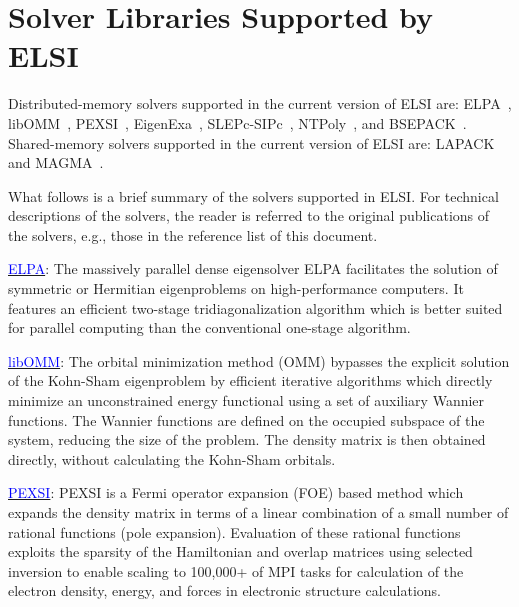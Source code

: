 \documentclass{report}
\newcommand{\tcb}[1]{\textcolor{blue}{#1}}
\begin{document}
\section{Solver Libraries Supported by ELSI}
\label{sec:solvers}
Distributed-memory solvers supported in the current version of ELSI are: ELPA~\cite{elpa_auckenthaler_2011,elpa_marek_2014,elpa_kus_2019a,elpa_kus_2019b}, libOMM~\cite{libomm_corsetti_2014}, PEXSI~\cite{pexsi_lin_2009,pexsi_lin_2013,pexsi_lin_2014,pselinv_jacquelin_2016,pexsi_jia_2017}, EigenExa~\cite{eigenexa_imamura_2011,eigenexa_fukaya_2015}, SLEPc-SIPc~\cite{slepc_hernandez_2005,sips_campos_2012,sips_keceli_2016,sips_keceli_2018}, NTPoly~\cite{ntpoly_dawson_2018}, and BSEPACK~\cite{bsepack_shao_2016}. Shared-memory solvers supported in the current version of ELSI are: LAPACK~\cite{lapack_anderson_1999} and MAGMA~\cite{magma_tomov_2010,magma_dongarra_2014}.

What follows is a brief summary of the solvers supported in ELSI. For technical descriptions of the solvers, the reader is referred to the original publications of the solvers, e.g., those in the reference list of this document.

\href{https://elpa.mpcdf.mpg.de}{\tcb{ELPA}}: The massively parallel dense eigensolver ELPA facilitates the solution of symmetric or Hermitian eigenproblems on high-performance computers. It features an efficient two-stage tridiagonalization algorithm which is better suited for parallel computing than the conventional one-stage algorithm.

\href{https://esl.cecam.org/LibOMM}{\tcb{libOMM}}: The orbital minimization method (OMM) bypasses the explicit solution of the Kohn-Sham eigenproblem by efficient iterative algorithms which directly minimize an unconstrained energy functional using a set of auxiliary Wannier functions. The Wannier functions are defined on the occupied subspace of the system, reducing the size of the problem. The density matrix is then obtained directly, without calculating the Kohn-Sham orbitals.

\href{https://pexsi.readthedocs.io/en/latest}{\tcb{PEXSI}}: PEXSI is a Fermi operator expansion (FOE) based method which expands the density matrix in terms of a linear combination of a small number of rational functions (pole expansion). Evaluation of these rational functions exploits the sparsity of the Hamiltonian and overlap matrices using selected inversion to enable scaling to 100,000+ of MPI tasks for calculation of the electron density, energy, and forces in electronic structure calculations.
\end{document}
